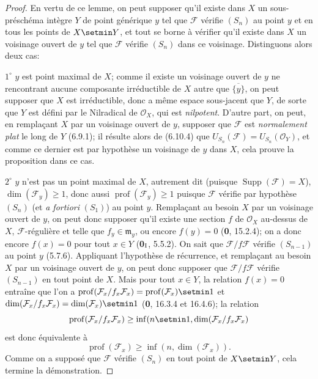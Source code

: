 \begin{proof}
En vertu de ce lemme, on peut supposer qu'il existe dans $X$ un
sous-préschéma intègre $Y$ de point générique $y$ tel que $\mathcal F$
vérifie $(S_n)$ au point $y$ et en tous les points de $X\setmin Y$, et tout se
borne à vérifier qu'il existe dans $X$ un voisinage ouvert de $y$ tel que
$\mathcal F$ vérifie $(S_n)$ dans ce voisinage. Distinguons alors deux cas:

$1^\circ$ $y$ est point maximal de $X$; comme il existe un voisinage ouvert
de $y$ ne rencontrant aucune composante irréductible de $X$ autre que
$\overline{\{y\}}$, on peut supposer que $X$ est irréductible, donc a même
espace sous-jacent que $Y$, de sorte que $Y$ est défini par le Nilradical de
$\mathcal O_X$, qui est \emph{nilpotent}. D'autre part, on peut, en remplaçant $X$
par un voisinage ouvert de $y$, supposer que $\mathcal F$ est \emph{normalement
plat} le long de $Y$ (6.9.1); il résulte alors de (6.10.4) que
$U_{S_n}(\mathcal F)=U_{S_n}(\mathcal O_Y)$, et comme ce dernier est par
hypothèse un voisinage de $y$ dans $X$, cela prouve la proposition dans ce
cas.


$2^\circ$ $y$ n'est pas un point maximal de $X$, autrement dit (puisque
$\operatorname{Supp}(\mathcal F)=X$), $\dim(\mathcal F_y)\geq1$, donc aussi
$\operatorname{prof}(\mathcal F_y)\geq1$ puisque $\mathcal F$ vérifie par
hypothèse $(S_n)$ (et \emph{a fortiori} $(S_1)$) au point $y$. Remplaçant au besoin
$X$ par un voisinage ouvert de $y$, on peut donc supposer qu'il existe une
section $f$ de $\mathcal O_X$ au-dessus de $X$, $\mathcal F$-régulière et
telle que $f_y\in\mathfrak m_y$, ou encore $f(y)=0$ (\textbf{0}, 15.2.4); on a donc
encore $f(x)=0$ pour tout $x\in Y$ (\textbf{0}$_{\rm I}$, 5.5.2). On sait que
$\mathcal F/f\mathcal F$ vérifie $(S_{n-1})$ au point $y$ (5.7.6).
Appliquant l'hypothèse de récurrence, et remplaçant au besoin $X$ par un
voisinage ouvert de $y$, on peut donc supposer que
$\mathcal F/f\mathcal F$ vérifie $(S_{n-1})$ en tout point de $X$. Mais pour
tout $x\in Y$, la relation $f(x)=0$ entraîne que l'on a
$\operatorname{prof}(\mathcal F_x/f_x\mathcal F_x)=
\operatorname{prof}(\mathcal F_x)\setmin 1$ et
$\dim(\mathcal F_x/f_x\mathcal F_x)=\dim(\mathcal F_x)\setmin 1$
(\textbf{0}, 16.3.4 et 16.4.6); la relation
\[
\operatorname{prof}(\mathcal F_x/f_x\mathcal F_x)\geq
\inf(n\setmin 1,\dim(\mathcal F_x/f_x\mathcal F_x)
\]
est donc équivalente à
\[
\operatorname{prof}(\mathcal F_x)\geq\inf(n,\dim(\mathcal F_x)).
\]
Comme on a supposé que $\mathcal F$ vérifie $(S_n)$ en tout point de $X\setmin Y$,
cela termine la démonstration.
\end{proof}

